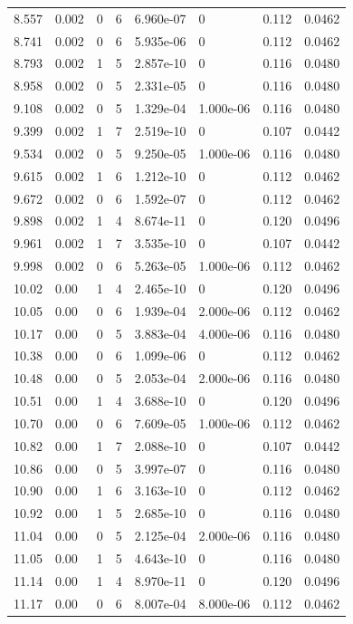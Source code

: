 \documentclass[preview]{standalone}
\begin{document}
{{{\begin{tabular}{L{1.2cm}C{1.2cm} C{0.3cm}C{0.5cm} C{1.4cm}C{1.4cm} C{1.4cm}C{1.4cm}}
  8.557  &  0.002  & 0     &  6 &  6.960e-07  & 0  & 0.112 &  0.0462   \\ 
  8.741  &  0.002  & 0     &  6 &  5.935e-06  & 0  & 0.112 &  0.0462   \\ 
  8.793  &  0.002  & 1     &  5 &  2.857e-10  & 0  & 0.116 &  0.0480   \\ 
  8.958  &  0.002  & 0     &  5 &  2.331e-05  & 0  & 0.116 &  0.0480   \\ 
  9.108  &  0.002  & 0     &  5 &  1.329e-04  & 1.000e-06  & 0.116 &  0.0480   \\ 
  9.399  &  0.002  & 1     &  7 &  2.519e-10  & 0  & 0.107 &  0.0442   \\ 
  9.534  &  0.002  & 0     &  5 &  9.250e-05  & 1.000e-06  & 0.116 &  0.0480   \\ 
  9.615  &  0.002  & 1     &  6 &  1.212e-10  & 0  & 0.112 &  0.0462   \\ 
  9.672  &  0.002  & 0     &  6 &  1.592e-07  & 0  & 0.112 &  0.0462   \\ 
  9.898  &  0.002  & 1     &  4 &  8.674e-11  & 0  & 0.120 &  0.0496   \\ 
  9.961  &  0.002  & 1     &  7 &  3.535e-10  & 0  & 0.107 &  0.0442   \\ 
  9.998  &  0.002  & 0     &  6 &  5.263e-05  & 1.000e-06  & 0.112 &  0.0462   \\ 
  10.02  &  0.00  & 1     &  4 &  2.465e-10  & 0  & 0.120 &  0.0496   \\ 
  10.05  &  0.00  & 0     &  6 &  1.939e-04  & 2.000e-06  & 0.112 &  0.0462   \\ 
  10.17  &  0.00  & 0     &  5 &  3.883e-04  & 4.000e-06  & 0.116 &  0.0480   \\ 
  10.38  &  0.00  & 0     &  6 &  1.099e-06  & 0  & 0.112 &  0.0462   \\ 
  10.48  &  0.00  & 0     &  5 &  2.053e-04  & 2.000e-06  & 0.116 &  0.0480   \\ 
  10.51  &  0.00  & 1     &  4 &  3.688e-10  & 0  & 0.120 &  0.0496   \\ 
  10.70  &  0.00  & 0     &  6 &  7.609e-05  & 1.000e-06  & 0.112 &  0.0462   \\ 
  10.82  &  0.00  & 1     &  7 &  2.088e-10  & 0  & 0.107 &  0.0442   \\ 
  10.86  &  0.00  & 0     &  5 &  3.997e-07  & 0  & 0.116 &  0.0480   \\ 
  10.90  &  0.00  & 1     &  6 &  3.163e-10  & 0  & 0.112 &  0.0462   \\ 
  10.92  &  0.00  & 1     &  5 &  2.685e-10  & 0  & 0.116 &  0.0480   \\ 
  11.04  &  0.00  & 0     &  5 &  2.125e-04  & 2.000e-06  & 0.116 &  0.0480   \\ 
  11.05  &  0.00  & 1     &  5 &  4.643e-10  & 0  & 0.116 &  0.0480   \\ 
  11.14  &  0.00  & 1     &  4 &  8.970e-11  & 0  & 0.120 &  0.0496   \\ 
  11.17  &  0.00  & 0     &  6 &  8.007e-04  & 8.000e-06  & 0.112 &  0.0462   \\ 
\hline 
\end{tabular} 

}}}
\end{document}
